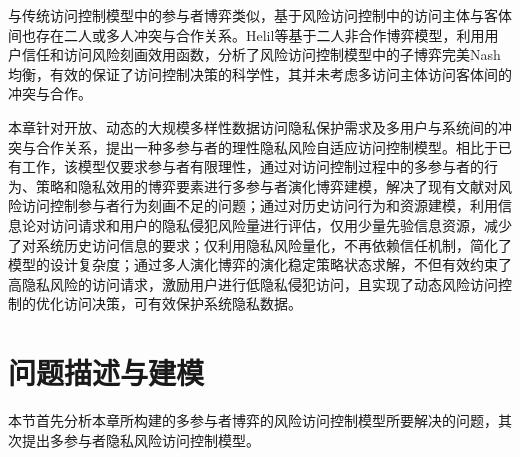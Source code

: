 与传统访问控制模型中的参与者博弈\cite{gao2018game,hu2014game,liu2016dynamic}类似，基于风险访问控制中的访问主体与客体间也存在二人或多人冲突与合作关系。Helil等\cite{helil2017non}基于二人非合作博弈模型，利用用户信任和访问风险刻画效用函数，分析了风险访问控制模型中的子博弈完美Nash均衡，有效的保证了访问控制决策的科学性，其并未考虑多访问主体访问客体间的冲突与合作。

本章针对开放、动态的大规模多样性数据访问隐私保护需求及多用户与系统间的冲突与合作关系，提出一种多参与者的理性隐私风险自适应访问控制模型。相比于已有工作，该模型仅要求参与者有限理性，通过对访问控制过程中的多参与者的行为、策略和隐私效用的博弈要素进行多参与者演化博弈建模，解决了现有文献对风险访问控制参与者行为刻画不足的问题；通过对历史访问行为和资源建模，利用信息论对访问请求和用户的隐私侵犯风险量进行评估，仅用少量先验信息资源，减少了对系统历史访问信息的要求；仅利用隐私风险量化，不再依赖信任机制，简化了模型的设计复杂度；通过多人演化博弈的演化稳定策略状态求解，不但有效约束了高隐私风险的访问请求，激励用户进行低隐私侵犯访问，且实现了动态风险访问控制的优化访问决策，可有效保护系统隐私数据。

\section{问题描述与建模}
本节首先分析本章所构建的多参与者博弈的风险访问控制模型所要解决的问题，其次提出多参与者隐私风险访问控制模型。

